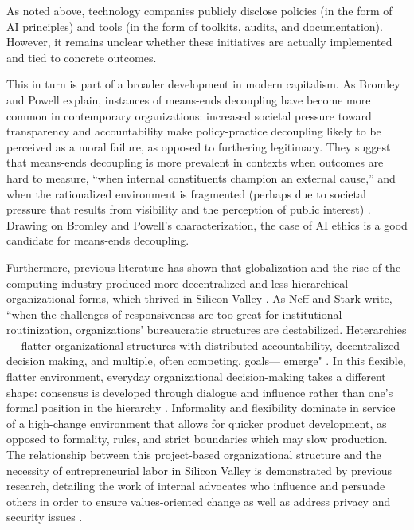 \documentclass[sigconf]{acmart}
\begin{document}
As noted above, technology companies publicly disclose  policies (in the form of AI principles) and tools (in the form of toolkits, audits, and documentation). However, it remains unclear whether these initiatives are actually implemented and tied to concrete outcomes.

This in turn is part of a broader development in modern capitalism. As Bromley and Powell explain, instances of means-ends decoupling have become more common in contemporary organizations: increased societal pressure toward transparency and accountability make policy-practice decoupling likely to be perceived as a moral failure, as opposed to furthering legitimacy. They suggest that means-ends decoupling is more prevalent in contexts when outcomes are hard to measure, “when internal constituents champion an external cause,” and when the rationalized environment is fragmented (perhaps due to societal pressure that results from visibility and the perception of public interest) \cite{bromley_smoke_2012}. Drawing on Bromley and Powell’s characterization, the case of AI ethics is a good candidate for means-ends decoupling.

Furthermore, previous literature has shown that globalization and the rise of the computing industry produced more decentralized and less hierarchical organizational forms, which thrived in Silicon Valley \cite{powell_capitalist_2001, saxenian_new_2006}. As Neff and Stark write, “when the challenges of responsiveness are too great for institutional routinization, organizations’ bureaucratic structures are destabilized. Heterarchies— flatter organizational structures with distributed accountability, decentralized decision making, and multiple, often competing, goals— emerge" \cite{neff_permanently_2004}. In this flexible, flatter environment, everyday organizational decision-making takes a different shape: consensus is developed through dialogue and influence rather than one’s formal position in the hierarchy \cite{heckscher_defining_2011}. Informality and flexibility dominate in service of a high-change environment that allows for quicker product development, as opposed to formality, rules, and strict boundaries which may slow production. The relationship between this project-based organizational structure and the necessity of entrepreneurial labor in Silicon Valley is demonstrated by previous research, detailing the work of internal advocates who influence and persuade others in order to ensure values-oriented change \cite{wong_UX_2021} as well as address privacy \cite{tahaei_privacy_2021} and security issues \cite{tondel_security_2020, haney_cybersecurity_2018}.
\end{document}
